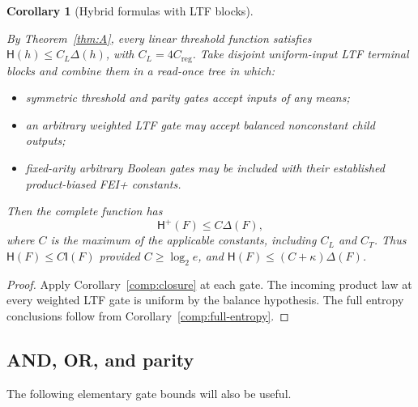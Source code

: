 \documentclass[11pt]{amsart}
\newtheorem{corollary}[theorem]{Corollary}
\theoremstyle{definition}
\theoremstyle{remark}
\newcommand{\HH}{\mathsf H}
\newcommand{\I}{\mathsf I}
\newcommand{\Creg}{C_{\mathrm{reg}}}
\begin{document}
\begin{corollary}[Hybrid formulas with LTF blocks]\label{comp:hybrid}

By Theorem~\ref{thm:A}, every linear threshold function satisfies \(\HH(h)\le C_L\Delta(h)\), with \(C_L=4\Creg\). Take disjoint uniform-input LTF terminal blocks and combine them in a read-once tree in which:

\begin{itemize}
\item
  symmetric threshold and parity gates accept inputs of any means;
\item
  an arbitrary weighted LTF gate may accept balanced nonconstant child outputs;
\item
  fixed-arity arbitrary Boolean gates may be included with their established product-biased FEI+ constants.
\end{itemize}

Then the complete function has \[
 \HH^+(F)\le C \Delta(F),
\] where \(C\) is the maximum of the applicable constants, including \(C_L\) and \(C_T\). Thus \(\HH(F)\le C \I(F)\) provided \(C\ge\log_2e\), and \(\HH(F)\le(C+\kappa)\Delta(F)\).

\end{corollary}
\begin{proof}

Apply Corollary~\ref{comp:closure} at each gate. The incoming product law at every weighted LTF gate is uniform by the balance hypothesis. The full entropy conclusions follow from Corollary~\ref{comp:full-entropy}.

\end{proof}

\subsection{AND, OR, and parity}\label{comp:elementary-section}

The following elementary gate bounds will also be useful.
\end{document}
